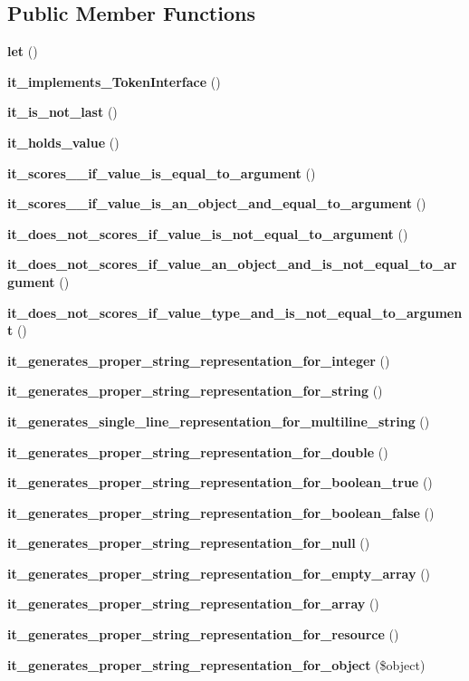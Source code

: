 \subsection*{Public Member Functions}
\begin{DoxyCompactItemize}
\item 
{\bf let} ()
\item 
{\bf it\+\_\+implements\+\_\+\+Token\+Interface} ()
\item 
{\bf it\+\_\+is\+\_\+not\+\_\+last} ()
\item 
{\bf it\+\_\+holds\+\_\+value} ()
\item 
{\bf it\+\_\+scores\+\_\+\_\+if\+\_\+value\+\_\+is\+\_\+equal\+\_\+to\+\_\+argument} ()
\item 
{\bf it\+\_\+scores\+\_\+\_\+if\+\_\+value\+\_\+is\+\_\+an\+\_\+object\+\_\+and\+\_\+equal\+\_\+to\+\_\+argument} ()
\item 
{\bf it\+\_\+does\+\_\+not\+\_\+scores\+\_\+if\+\_\+value\+\_\+is\+\_\+not\+\_\+equal\+\_\+to\+\_\+argument} ()
\item 
{\bf it\+\_\+does\+\_\+not\+\_\+scores\+\_\+if\+\_\+value\+\_\+an\+\_\+object\+\_\+and\+\_\+is\+\_\+not\+\_\+equal\+\_\+to\+\_\+argument} ()
\item 
{\bf it\+\_\+does\+\_\+not\+\_\+scores\+\_\+if\+\_\+value\+\_\+type\+\_\+and\+\_\+is\+\_\+not\+\_\+equal\+\_\+to\+\_\+argument} ()
\item 
{\bf it\+\_\+generates\+\_\+proper\+\_\+string\+\_\+representation\+\_\+for\+\_\+integer} ()
\item 
{\bf it\+\_\+generates\+\_\+proper\+\_\+string\+\_\+representation\+\_\+for\+\_\+string} ()
\item 
{\bf it\+\_\+generates\+\_\+single\+\_\+line\+\_\+representation\+\_\+for\+\_\+multiline\+\_\+string} ()
\item 
{\bf it\+\_\+generates\+\_\+proper\+\_\+string\+\_\+representation\+\_\+for\+\_\+double} ()
\item 
{\bf it\+\_\+generates\+\_\+proper\+\_\+string\+\_\+representation\+\_\+for\+\_\+boolean\+\_\+true} ()
\item 
{\bf it\+\_\+generates\+\_\+proper\+\_\+string\+\_\+representation\+\_\+for\+\_\+boolean\+\_\+false} ()
\item 
{\bf it\+\_\+generates\+\_\+proper\+\_\+string\+\_\+representation\+\_\+for\+\_\+null} ()
\item 
{\bf it\+\_\+generates\+\_\+proper\+\_\+string\+\_\+representation\+\_\+for\+\_\+empty\+\_\+array} ()
\item 
{\bf it\+\_\+generates\+\_\+proper\+\_\+string\+\_\+representation\+\_\+for\+\_\+array} ()
\item 
{\bf it\+\_\+generates\+\_\+proper\+\_\+string\+\_\+representation\+\_\+for\+\_\+resource} ()
\item 
{\bf it\+\_\+generates\+\_\+proper\+\_\+string\+\_\+representation\+\_\+for\+\_\+object} (\$object)
\end{DoxyCompactItemize}
